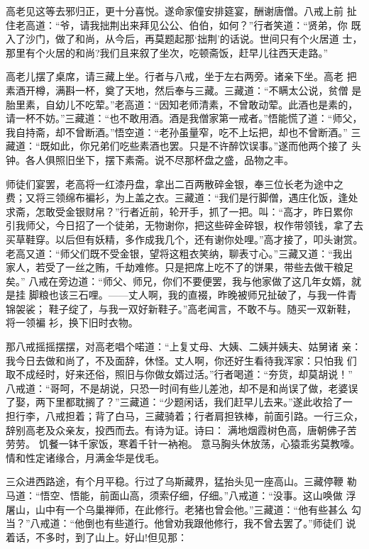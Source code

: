 高老见这等去邪归正，更十分喜悦。遂命家僮安排筵宴，酬谢唐僧。八戒上前
扯住老高道：“爷，请我拙荆出来拜见公公、伯伯，如何？”行者笑道：“贤弟，你
既入了沙门，做了和尚，从今后，再莫题起那‘拙荆’的话说。世间只有个火居道
士，那里有个火居的和尚?我们且来叙了坐次，吃顿斋饭，赶早儿往西天走路。”

高老儿摆了桌席，请三藏上坐。行者与八戒，坐于左右两旁。诸亲下坐。高老
把素酒开樽，满斟一杯，奠了天地，然后奉与三藏。三藏道：“不瞒太公说，贫僧
是胎里素，自幼儿不吃荤。”老高道：“因知老师清素，不曾敢动荤。此酒也是素的，
请一杯不妨。”三藏道：“也不敢用酒。酒是我僧家第一戒者。”悟能慌了道：“师父，
我自持斋，却不曾断酒。”悟空道：“老孙虽量窄，吃不上坛把，却也不曾断酒。”
三藏道：“既如此，你兄弟们吃些素酒也罢。只是不许醉饮误事。”遂而他两个接了
头钟。各人俱照旧坐下，摆下素斋。说不尽那杯盘之盛，品物之丰。

师徒们宴罢，老高将一红漆丹盘，拿出二百两散碎金银，奉三位长老为途中之
费；又将三领绵布褊衫，为上盖之衣。三藏道：“我们是行脚僧，遇庄化饭，逢处
求斋，怎敢受金银财帛？”行者近前，轮开手，抓了一把。叫：“高才，昨日累你
引我师父，今日招了一个徒弟，无物谢你，把这些碎金碎银，权作带领钱，拿了去
买草鞋穿。以后但有妖精，多作成我几个，还有谢你处哩。”高才接了，叩头谢赏。
老高又道：“师父们既不受金银，望将这粗衣笑纳，聊表寸心。”三藏又道：“我出
家人，若受了一丝之贿，千劫难修。只是把席上吃不了的饼果，带些去做干粮足矣。”
八戒在旁边道：“师父、师兄，你们不要便罢，我与他家做了这几年女婿，就是挂
脚粮也该三石哩。——丈人啊，我的直裰，昨晚被师兄扯破了，与我一件青锦袈裟；
鞋子绽了，与我一双好新鞋子。”高老闻言，不敢不与。随买一双新鞋，将一领褊
衫，换下旧时衣物。

那八戒摇摇摆摆，对高老唱个喏道：“上复丈母、大姨、二姨并姨夫、姑舅诸
亲：我今日去做和尚了，不及面辞，休怪。丈人啊，你还好生看待我浑家：只怕我
们取不成经时，好来还俗，照旧与你做女婿过活。”行者喝道：“夯货，却莫胡说！”
八戒道：“哥呵，不是胡说，只恐一时间有些儿差池，却不是和尚误了做，老婆误
了娶，两下里都耽搁了？”三藏道：“少题闲话，我们赶早儿去来。”遂此收拾了一
担行李，八戒担着；背了白马，三藏骑着；行者肩担铁棒，前面引路。一行三众，
辞别高老及众亲友，投西而去。有诗为证。诗曰：
满地烟霞树色高，唐朝佛子苦劳劳。
饥餐一钵千家饭，寒着千针一衲袍。
意马胸头休放荡，心猿乖劣莫教嚎。
情和性定诸缘合，月满金华是伐毛。

三众进西路途，有个月平稳。行过了乌斯藏界，猛抬头见一座高山。三藏停鞭
勒马道：“悟空、悟能，前面山高，须索仔细，仔细。”八戒道：“没事。这山唤做
浮屠山，山中有一个乌巢禅师，在此修行。老猪也曾会他。”三藏道：“他有些甚么
勾当？”八戒道：“他倒也有些道行。他曾劝我跟他修行，我不曾去罢了。”师徒们
说着话，不多时，到了山上。好山!但见那：

